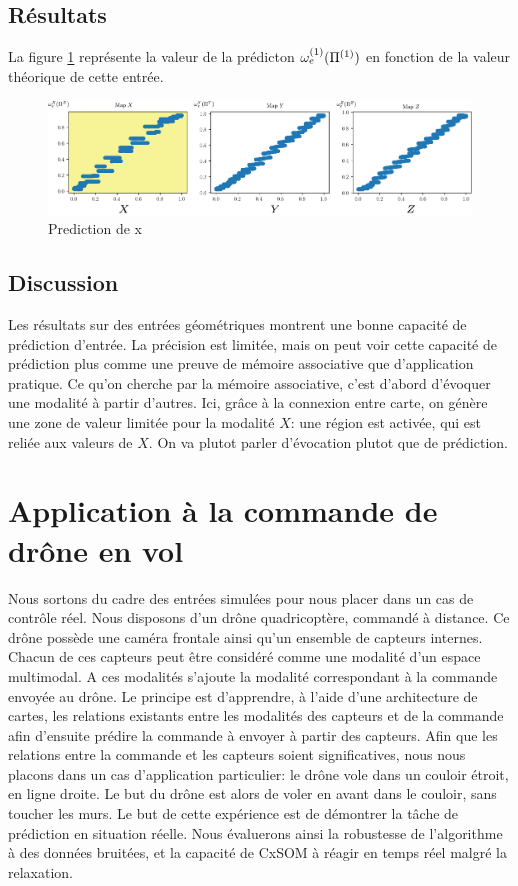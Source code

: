 \subsection{Résultats}
La figure \ref{fig:pred} représente la valeur de la prédicton $\omega_{e}^{({1})}(\Pi^{({1})})$ en fonction de la valeur théorique de cette entrée. 
\begin{figure}
\centering
\includegraphics[width=\textwidth]{prediction_x2}
\caption{Prediction de x}
\label{fig:pred}
\end{figure}


\subsection{Discussion}
Les résultats sur des entrées géométriques montrent une bonne capacité de prédiction d'entrée.
La précision est limitée, mais on peut voir cette capacité de prédiction plus comme une preuve de mémoire associative que d'application pratique.
Ce qu'on cherche par la mémoire associative, c'est d'abord d'évoquer une modalité à partir d'autres. Ici, grâce à la connexion entre carte, on génère une zone de valeur limitée pour la modalité $X$: une région est activée, qui est reliée aux valeurs de $X$.
On va plutot parler d'évocation plutot que de prédiction. 

\section{Application à la commande de drône en vol}

Nous sortons du cadre des entrées simulées pour nous placer dans un cas de contrôle réel. Nous disposons d'un drône quadricoptère, commandé à distance. Ce drône possède une caméra frontale ainsi qu'un ensemble de capteurs internes. Chacun de ces capteurs peut être considéré comme une modalité d'un espace multimodal. A ces modalités s'ajoute la modalité correspondant à la commande envoyée au drône.
Le principe est d'apprendre, à l'aide d'une architecture de cartes, les relations existants entre les modalités des capteurs et de la commande afin d'ensuite prédire la commande à envoyer à partir des capteurs.
Afin que les relations entre la commande et les capteurs soient significatives, nous nous placons dans un cas d'application particulier: le drône vole dans un couloir étroit, en ligne droite. Le but du drône est alors de voler en avant dans le couloir, sans toucher les murs.
Le but de cette expérience est de démontrer la tâche de prédiction en situation réelle. Nous évaluerons ainsi la robustesse de l'algorithme à des données bruitées, et la capacité de CxSOM à réagir en temps réel malgré la relaxation.

